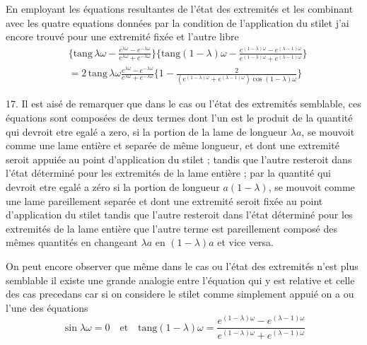 \documentclass[11pt,a4paper]{article}
\begin{document}
En employant les équations resultantes de l'état des extremités et les
combinant avec les quatre equations données par la condition de
l'application du stilet 
j'ai encore trouvé pour une extremité fixée et l'autre libre
\begin{align*}
&\Big\{\text{tang}\,\lambda\omega-\frac{e^{\lambda\omega}-e^{-\lambda\omega}}{e^{\lambda\omega}+e^{-\lambda\omega}}\Big\}\Big\{\text{tang}(1-\lambda)\omega-\frac{e^{(1-\lambda)\omega}-e^{(\lambda-1)\omega}}{e^{(1-\lambda)\omega}+e^{(\lambda-1)\omega}}\Big\} \\
&=2\,\text{tang}\,\lambda\omega\frac{e^{\lambda\omega}-e^{-\lambda\omega}}{e^{\lambda\omega}+e^{-\lambda\omega}}\Big\{1-\frac{2}{(e^{(1-\lambda)\omega}+e^{(\lambda-1)\omega})\cos(1-\lambda)\omega}\Big\}
\end{align*}

17. Il est aisé de remarquer que dans le cas ou \struck{\ill{}} l'état des
extremités  semblable, ces équations sont composées de deux
termes dont l'un est le produit de la quantité qui devroit etre egalé a
zero, si la portion de la lame de longueur $\lambda a$, se mouvoit comme une
lame entière et separée de même longueur, et dont une extremité seroit
appuiée au point d'application du stilet ; tandis que l'autre 
resteroit dans l'état déterminé pour les extremités de la lame entière ; par
la quantité qui devroit etre egalé a zéro si la portion de longueur
$a(1-\lambda)$, se mouvoit comme une lame pareillement separée et dont une
extremité seroit fixée au point d'application du stilet tandis que l'autre
resteroit dans l'état déterminé pour les extremités de la lame entière
 que l'autre terme est pareillement composé des mêmes quantités en
changeant $\lambda a$ en $(1-\lambda)a$ et vice versa.

On peut encore observer que même dans le cas ou l'état des extremités n'est
plus semblable il existe  une grande analogie entre l'équation
qui y est relative et celle des cas precedans car si on considere le stilet
comme simplement appuié on a 
ou l'une des équations
\[ \sin\lambda\omega=0 \quad\text{et}\quad \text{tang}(1-\lambda)\omega=\frac{e^{(1-\lambda)\omega}-e^{(\lambda-1)\omega}}{e^{(1-\lambda)\omega}+e^{(\lambda-1)\omega}} \]
\end{document}
